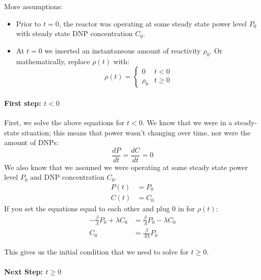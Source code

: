 \documentclass[letter]{article}
\begin{document}
More assumptions:
\begin{itemize}
\item Prior to $t=0$, the reactor was operating at some steady state
  power level $P_0$ with steady state DNP concentration $C_0$.
\item At $t=0$ we inserted an instantaneous amount of reactivity
  $\rho_0$. Or mathematically, replace $\rho(t)$ with:
  \begin{equation*}
    \rho(t)=
    \begin{cases}
      0 & t < 0 \\
      \rho_0 & t \geq 0
    \end{cases}
  \end{equation*}
\end{itemize}

\paragraph{First step: $t < 0$}
First, we solve the above equations for $t < 0$. We know that we were in a
steady-state situation; this means that power wasn't changing over
time, nor were the amount of DNPs:
\begin{equation*}
  \frac{dP}{dt}=\frac{dC}{dt}=0
\end{equation*}
We also know that we assumed we were operating at some steady state
power level $P_0$ and DNP concentration $C_0$.
\begin{equation*}
  \begin{split}
    P(t) &= P_0 \\
    C(t) &= C_0
  \end{split}
\end{equation*}
If you set the equations equal to each other and plug $0$ in for
$\rho(t)$:
\begin{equation*}
  \begin{split}
    -\frac{\beta}{\Lambda}P_0+\lambda{}C_0 &=
    \frac{\beta}{\Lambda}P_0-\lambda{}C_0 \\
    C_0 &= \frac{\beta}{\Lambda\lambda}P_0
  \end{split}
\end{equation*}

This gives us the initial condition that we need to solve for $t\geq 0$.

\paragraph{Next Step: $t \geq 0$}
\end{document}
